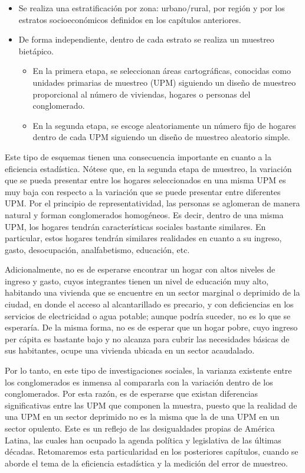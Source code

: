 \documentclass[
  12pt,
  spanish,
]{book}
\providecommand{\tightlist}{%
  \setlength{\itemsep}{0pt}\setlength{\parskip}{0pt}}
\begin{document}
\begin{itemize}
\tightlist
\item
  Se realiza una estratificación por zona: urbano/rural, por región y por los estratos socioeconómicos definidos en los capítulos anteriores.
\item
  De forma independiente, dentro de cada estrato se realiza un muestreo bietápico.

  \begin{itemize}
  \tightlist
  \item
    En la primera etapa, se seleccionan áreas cartográficas, conocidas como unidades primarias de muestreo (UPM) siguiendo un diseño de muestreo proporcional al número de viviendas, hogares o personas del conglomerado.
  \item
    En la segunda etapa, se escoge aleatoriamente un número fijo de hogares dentro de cada UPM siguiendo un diseño de muestreo aleatorio simple.
  \end{itemize}
\end{itemize}

Este tipo de esquemas tienen una consecuencia importante en cuanto a la eficiencia estadística. Nótese que, en la segunda etapa de muestreo, la variación que se pueda presentar entre los hogares seleccionados en una misma UPM es muy baja con respecto a la variación que se puede presentar entre diferentes UPM. Por el principio de representatividad, las personas se aglomeran de manera natural y forman conglomerados homogéneos. Es decir, dentro de una misma UPM, los hogares tendrán características sociales bastante similares. En particular, estos hogares tendrán similares realidades en cuanto a su ingreso, gasto, desocupación, analfabetismo, educación, etc.

Adicionalmente, no es de esperarse encontrar un hogar con altos niveles de ingreso y gasto, cuyos integrantes tienen un nivel de educación muy alto, habitando una vivienda que se encuentre en un sector marginal o deprimido de la ciudad, en donde el acceso al alcantarillado es precario, y con deficiencias en los servicios de electricidad o agua potable; aunque podría suceder, no es lo que se esperaría. De la misma forma, no es de esperar que un hogar pobre, cuyo ingreso per cápita es bastante bajo y no alcanza para cubrir las necesidades básicas de sus habitantes, ocupe una vivienda ubicada en un sector acaudalado.

Por lo tanto, en este tipo de investigaciones sociales, la varianza existente entre los conglomerados es inmensa al compararla con la variación dentro de los conglomerados. Por esta razón, es de esperarse que existan diferencias significativas entre las UPM que componen la muestra, puesto que la realidad de una UPM en un sector deprimido no es la misma que la de una UPM en un sector opulento. Este es un reflejo de las desigualdades propias de América Latina, las cuales han ocupado la agenda política y legislativa de las últimas décadas. Retomaremos esta particularidad en los posteriores capítulos, cuando se aborde el tema de la eficiencia estadística y la medición del error de muestreo.
\end{document}
